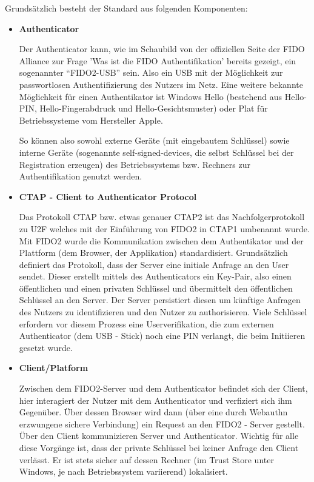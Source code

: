 Grundsätzlich besteht der Standard aus folgenden Komponenten:

\begin{itemize} 
\item \textbf{Authenticator}

Der Authenticator kann, wie im Schaubild von der offiziellen Seite der FIDO Alliance zur Frage 'Was ist die FIDO Authentifikation' bereits gezeigt, ein sogenannter ``FIDO2-USB'' sein. Also ein USB mit der Möglichkeit zur passwortlosen Authentifizierung des Nutzers im Netz. Eine weitere bekannte Möglichkeit für einen Authentikator ist Windows Hello (bestehend aus Hello-PIN, Hello-Fingerabdruck und Hello-Gesichtsmuster) oder Plat für Betriebssysteme vom Hersteller Apple.
\newpage

So können also sowohl externe Geräte (mit eingebautem Schlüssel) sowie interne Geräte (sogenannte self-signed-devices, die selbst Schlüssel bei der Registration erzeugen) des Betriebssystems bzw. Rechners zur Authentifikation genutzt werden.

\item \textbf{CTAP - Client to Authenticator Protocol}

Das Protokoll CTAP bzw. etwas genauer CTAP2 ist das Nachfolgerprotokoll zu U2F welches mit der Einführung von FIDO2 in CTAP1 umbenannt wurde. Mit FIDO2 wurde die Kommunikation zwischen dem Authentikator und der Plattform (dem Browser, der Applikation) standardisiert. Grundsätzlich definiert das Protokoll, dass der Server eine initiale Anfrage an den User sendet. Dieser erstellt mittels des Authenticators ein Key-Pair, also einen öffentlichen und einen privaten Schlüssel und übermittelt den öffentlichen Schlüssel an den Server. Der Server persistiert diesen um künftige Anfragen des Nutzers zu identifizieren und den Nutzer zu authorisieren. Viele Schlüssel erfordern vor diesem Prozess eine Userverifikation, die zum externen Authenticator (dem USB - Stick) noch eine PIN verlangt, die beim Initiieren gesetzt wurde.

\item \textbf{Client/Platform}

Zwischen dem FIDO2-Server und dem Authenticator befindet sich der Client, hier interagiert der Nutzer mit dem Authenticator und verfiziert sich ihm Gegenüber. Über dessen Browser wird dann (über eine durch Webauthn erzwungene sichere Verbindung) ein Request an den FIDO2 - Server gestellt. Über den Client kommunizieren Server und Authenticator. Wichtig für alle diese Vorgänge ist, dass der private Schlüssel bei keiner Anfrage den Client verlässt. Er ist stets sicher auf dessen Rechner (im Trust Store unter Windows, je nach Betriebssystem variierend) lokalisiert.


\end{itemize}
